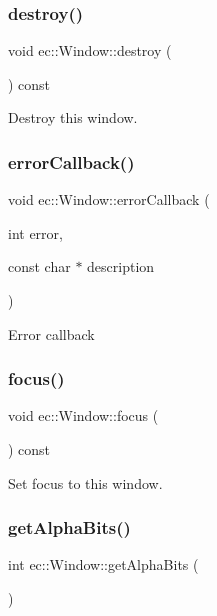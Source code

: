 \subsubsection{\texorpdfstring{destroy()}{destroy()}}
{\footnotesize\ttfamily void ec\+::\+Window\+::destroy (\begin{DoxyParamCaption}{ }\end{DoxyParamCaption}) const}

Destroy this window. \mbox{\label{classec_1_1_window_a1d202aaa954ea0b62cf380fb48288107}} 
\subsubsection{\texorpdfstring{error\+Callback()}{errorCallback()}}
{\footnotesize\ttfamily void ec\+::\+Window\+::error\+Callback (\begin{DoxyParamCaption}\item[{int}]{error,  }\item[{const char $\ast$}]{description }\end{DoxyParamCaption})\hspace{0.3cm}{\ttfamily [static]}}

Error callback \mbox{\label{classec_1_1_window_a927c041d6913c385efef327b091d5f4f}} 
\subsubsection{\texorpdfstring{focus()}{focus()}}
{\footnotesize\ttfamily void ec\+::\+Window\+::focus (\begin{DoxyParamCaption}{ }\end{DoxyParamCaption}) const}

Set focus to this window. \mbox{\label{classec_1_1_window_ac5bbb3be571ab430ad662b8ca9f7528a}} 
\subsubsection{\texorpdfstring{get\+Alpha\+Bits()}{getAlphaBits()}}
{\footnotesize\ttfamily int ec\+::\+Window\+::get\+Alpha\+Bits (\begin{DoxyParamCaption}{ }\end{DoxyParamCaption})\hspace{0.3cm}{\ttfamily [static]}}

